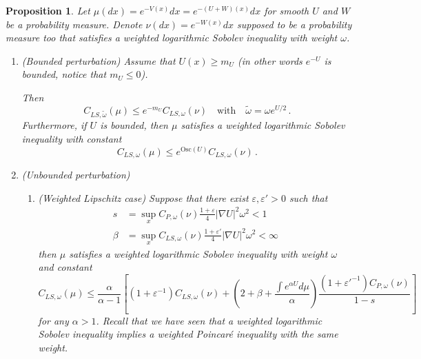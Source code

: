 \documentclass[11pt,reqno]{amsart}
\numberwithin{equation}{section}
\newtheorem{proposition}[theorem]{Proposition}
\theoremstyle{definition}
\theoremstyle{remark}
\def \Osc {\textrm{Osc}}
\begin{document}
\begin{proposition}\label{propWeightLSIperturb}
Let $\mu(dx)= e^{-V(x)}dx=e^{-(U+W)(x)} dx$ for smooth $U$ and $W$ be a probability measure. Denote $\nu(dx)=e^{-W(x)}dx$ supposed to be a probability measure too that satisfies a weighted logarithmic Sobolev inequality with weight $\omega$. 
\begin{enumerate}
     \item (Bounded perturbation) Assume that $U(x) \geq m_U$ (in other words $e^{-U}$ is bounded, notice that $m_U\leq 0$).

Then $$C_{LS, \tilde\omega}(\mu)\leq e^{-m_U} C_{LS, \omega}(\nu)\quad\textrm{with} \quad\tilde\omega=\omega e^{U/2} \, .$$
Furthermore, if $U$ is bounded, then $\mu$ satisfies a weighted logarithmic Sobolev inequality with constant $$C_{LS, \omega}(\mu)\leq e^{\Osc(U)} C_{LS, \omega}(\nu)\, .$$
\item (Unbounded perturbation)
\begin{enumerate}
    \item (Weighted Lipschitz case) Suppose that there exist $\varepsilon, \varepsilon'>0$ such that
    \begin{align*}
    s&=\sup_x C_{P, \omega}(\nu)\frac{1+\varepsilon}{4}|\nabla U|^2\omega^2<1\\
        \beta&=\sup_x C_{LS, \omega}(\nu)\frac{1+\varepsilon'}{4}|\nabla U|^2\omega^2<\infty
    \end{align*}
    then $\mu$ satisfies a weighted logarithmic Sobolev inequality with weight $\omega$ and constant
    $$C_{LS,\omega}(\mu)\le \frac{\alpha}{\alpha-1} \left[(1+\varepsilon^{-1}) C_{LS, \omega}(\nu)+\left(2+\beta + \frac{\int e^{\alpha U} d\mu}{\alpha}\right)\frac{(1+\varepsilon'^{-1})C_{P,\omega}(\nu)}{1-s}\right]$$
    for any $\alpha>1$.
    Recall that we have seen that a weighted logarithmic Sobolev inequality implies a weighted Poincar\'e inequality with the same weight.


\end{enumerate}
\end{enumerate}
\end{proposition}
\end{document}
